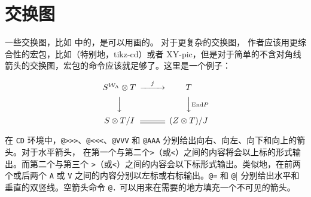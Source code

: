 
\chapter{交换图}
一些交换图，比如  中的，是可以用画的。 对于更复杂的交换图，  作者应该用更综合性的宏包，比如\TikZ（特别地，{\ttfamily tikz-cd}）或者 XY-pic，但是对于简单的不含对角线箭头的交换图，宏包的命令应该就足够了。这里是一个例子：
\begin{tcblisting}{}
\[
\begin{CD}
S^{\mathcal{W}_\Lambda}\otimes T @>j>>  T\\
@VVV                                    @VV{\text{End} P}V\\
{S\otimes T}/I                  @=      (Z\otimes T)/J
\end{CD}
\]
\end{tcblisting}

在 \verb|CD| 环境中，\verb|@>>>|、\verb|@<<<|、\verb|@VVV| 和 \verb|@AAA| 分别给出向右、向左、向下和向上的箭头。对于水平箭头，  在第一个与第二个\verb|>|（或\verb|<|）之间的内容将会以上标的形式输出。而第二个与第三个 \verb|>|（或\verb|<|）之间的内容会以下标形式输出。类似地，在前两个或后两个 \verb|A| 或 \verb|V| 之间的内容分别以左标或右标输出。\verb|@=| 和 \verb|@|| 分别给出水平和垂直的双竖线。空箭头命令 \verb|@.| 可以用来在需要的地方填充一个不可见的箭头。